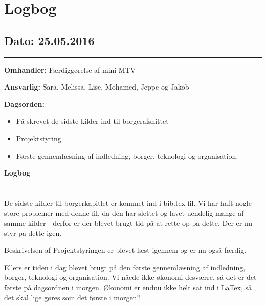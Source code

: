\chapter{Logbog}

\section{Dato: 25.05.2016}
\hrule

\textbf{Omhandler:} Færdiggørelse af mini-MTV

\textbf{Ansvarlig:} Sara, Melissa, Lise, Mohamed, Jeppe og Jakob

\textbf{Dagsorden:}
\begin{itemize}
	\item Få skrevet de sidste kilder ind til borgerafsnittet
	\item Projektstyring 
	\item Første gennemlæsning af indledning, borger, teknologi og organisation. 
\end{itemize}

\textbf{Logbog}
\\
\\ \\
De sidste kilder til borgerkapitlet er kommet ind i bib.tex fil. Vi har haft nogle store problemer med denne fil, da den har slettet og lavet uendelig mange af samme kilder - derfor er der blevet brugt tid på at rette op på dette. Der er nu styr på dette igen. 

Beskrivelsen af Projektstyringen er blevet læst igennem og er nu også færdig.

Ellers er tiden i dag blevet brugt på den første gennemlæsning af indledning, borger, teknologi og organisation. Vi nåede ikke økonomi desværre, så det er det første på dagsordnen i morgen. Økonomi er endnu ikke helt sat ind i LaTex, så det skal lige gøres som det første i morgen!! 
 



